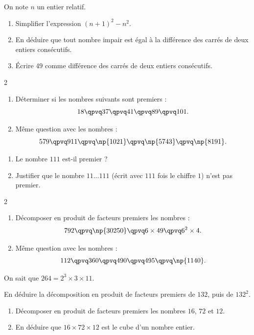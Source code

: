On note $n$ un entier relatif.
\begin{enumerate}
\item Simplifier l'expression $(n+1)^2-n^2$.
\item En déduire que tout nombre impair est égal à la différence des carrés de deux entiers consécutifs.
\item Écrire $49$ comme différence des carrés de deux entiers consécutifs.
\end{enumerate}

\exo

\setlength{\columnsep}{1cm}
\setlength{\columnseprule}{0pt}
\begin{multicols}{2}
\begin{enumerate}
\item Déterminer si les nombres suivants sont premiers :
\[18 \qpvq 37 \qpvq 41 \qpvq 89 \qpvq 101.\]
\item Même question avec les nombres :
\[579 \qpvq 911 \qpvq \np{1021} \qpvq \np{5743} \qpvq \np{8191}.\]
\end{enumerate}
\end{multicols}

\exo

\begin{enumerate}
\item Le nombre $111$ est-il premier ?
\item Justifier que le nombre $11\dots{}111$ (écrit avec $111$ fois le chiffre $1$) n'est pas premier.
\end{enumerate}

\exo

\setlength{\columnsep}{1cm}
\setlength{\columnseprule}{0pt}
\begin{multicols}{2}
\begin{enumerate}
\item Décomposer en produit de facteurs premiers les nombres :
\[792 \qpvq \np{30250} \qpvq 6\times 49 \qpvq 6^2\times 4.\]
\item Même question avec les nombres :
\[112 \qpvq 360 \qpvq 490 \qpvq 495 \qpvq \np{1140}.\]
\end{enumerate}
\end{multicols}

\exo 

On sait que $264=2^3\times 3\times 11$.

En déduire la décomposition en produit de facteurs premiers de $132$, puis de $132^2$.

\exo

\begin{enumerate}
\item Décomposer en produit de facteurs premiers les nombres $16$, $72$ et $12$.
\item En déduire que $16\times 72\times 12$ est le cube d'un nombre entier.
\end{enumerate}

